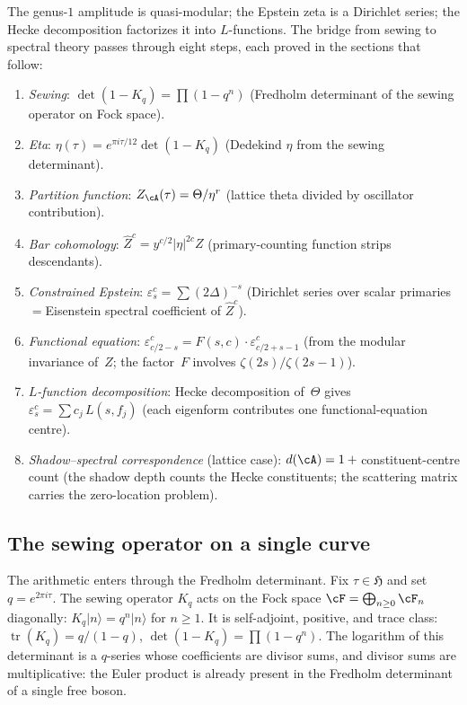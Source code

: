 The genus-$1$ amplitude is quasi-modular; the Epstein zeta is
a Dirichlet series; the Hecke decomposition factorizes it into
$L$-functions. The bridge from sewing to spectral theory
passes through eight steps, each proved in the sections that
follow:
\begin{enumerate}[label=\textup{(\arabic*)}]
\item \emph{Sewing}:
 $\det(1{-}K_q) = \prod(1{-}q^n)$
 (Fredholm determinant of the sewing operator on Fock space).
\item \emph{Eta}:
 $\eta(\tau) = e^{\pi i\tau/12}\det(1{-}K_q)$
 (Dedekind $\eta$ from the sewing determinant).
\item \emph{Partition function}:
 $Z_\cA(\tau) = \Theta/\eta^r$
 (lattice theta divided by oscillator contribution).
\item \emph{Bar cohomology}:
 $\widehat{Z}^c = y^{c/2}\lvert\eta\rvert^{2c}Z$
 (primary-counting function strips descendants).
\item \emph{Constrained Epstein}:
 $\varepsilon^c_s = \sum(2\Delta)^{-s}$
 (Dirichlet series over scalar primaries $= $Eisenstein spectral
 coefficient of $\widehat{Z}^c$).
\item \emph{Functional equation}:
 $\varepsilon^c_{c/2-s} = F(s,c)\cdot\varepsilon^c_{c/2+s-1}$
 (from the modular invariance of~$Z$; the factor~$F$ involves
 $\zeta(2s)/\zeta(2s{-}1)$).
\item \emph{$L$-function decomposition}:
 Hecke decomposition of~$\Theta$ gives
 $\varepsilon^c_s = \sum c_j\,L(s,f_j)$
 (each eigenform contributes one functional-equation centre).
\item \emph{Shadow--spectral correspondence} (lattice case):
 $d(\cA) = 1 + {}$constituent-centre count
 (the shadow depth counts the Hecke constituents; the scattering
 matrix carries the zero-location problem).
\end{enumerate}

\subsection{The sewing operator on a single curve}

The arithmetic enters through the Fredholm determinant.
Fix $\tau\in\mathfrak{H}$ and set $q=e^{2\pi i\tau}$. The sewing
operator $K_q$ acts on the Fock space $\cF=\bigoplus_{n\ge0}\cF_n$
diagonally: $K_q\lvert n\rangle = q^n\lvert n\rangle$ for $n\ge1$.
It is self-adjoint, positive, and trace class:
$\operatorname{tr}(K_q)=q/(1-q)$, $\det(1-K_q)=\prod(1-q^n)$.
The logarithm of this determinant is a $q$-series whose
coefficients are divisor sums, and divisor sums are
multiplicative: the Euler product is already present
in the Fredholm determinant of a single free boson.

